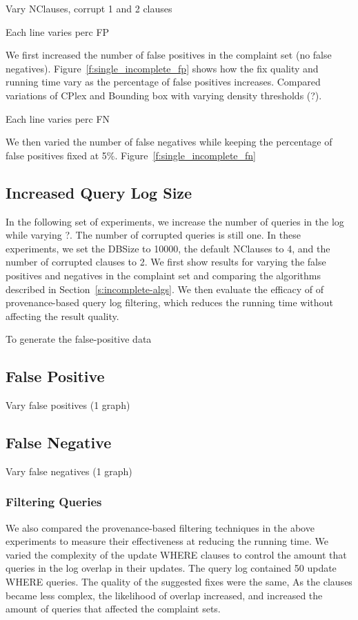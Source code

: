 Vary NClauses, corrupt 1 and 2 clauses

Each line varies perc FP

We first increased the number of false positives in the complaint set (no false negatives).
Figure~\ref{f:single_incomplete_fp} shows how the fix quality and running time vary as the
percentage of false positives increases.   Compared variations of CPlex and Bounding box with varying
density thresholds (?).

Each line varies perc FN

We then varied the number of false negatives while keeping the percentage of false positives fixed at 5\%.
Figure~\ref{f:single_incomplete_fn} 


\subsection{Increased Query Log Size}

In the following set of experiments, we increase the number of
queries in the log while varying ?.  The number of corrupted queries
is still one.  In these experiments, we set the DBSize to 10000,
the default NClauses to 4, and the number of corrupted clauses to
2.   We first show results for varying the false positives and
negatives in the complaint set and comparing the algorithms described
in Section~\ref{s:incomplete-algs}.  We then evaluate the efficacy
of of provenance-based query log filtering, which reduces the running
time without affecting the result quality.

To generate the false-positive data

\subsection{False Positive}

Vary false positives (1 graph)

\subsection{False Negative}

Vary false negatives (1 graph)

\subsubsection{Filtering Queries}

We also compared the provenance-based filtering techniques in the above experiments
to measure their effectiveness at reducing the running time.  We varied the complexity of the update 
WHERE clauses to control the amount that queries in the log overlap in their updates.  The query log contained 50 update WHERE queries.
The quality of the suggested fixes were the same,  As the clauses became less complex, the likelihood 
of overlap increased, and increased the amount of queries that affected the complaint sets.


